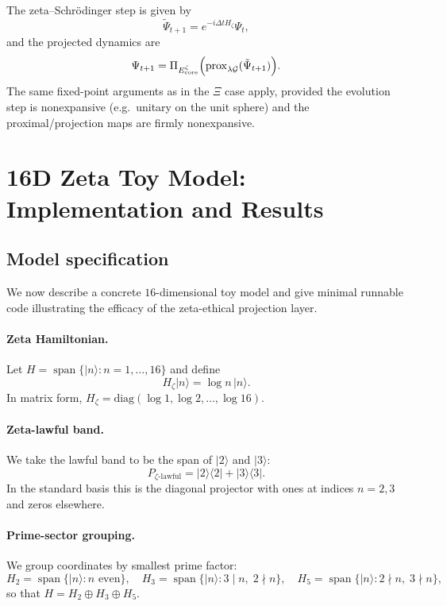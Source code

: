\documentclass[11pt]{article}
\begin{document}
The zeta--Schr\"odinger step is given by
\begin{equation}
  \tilde{\Psi}_{t+1} = e^{-i \Delta t H_\zeta}\Psi_t,
\end{equation}
and the projected dynamics are
\begin{equation}
  \Psi_{t+1} = \Pi_{E_{\mathrm{core}}^{\zeta}}
  \Bigl( \operatorname{prox}_{\lambda\mathcal{G}}(\tilde{\Psi}_{t+1}) \Bigr).
\end{equation}
The same fixed-point arguments as in the $\Xi$ case apply, provided the evolution step
is nonexpansive (e.g.\ unitary on the unit sphere) and the proximal/projection maps
are firmly nonexpansive.

\section{16D Zeta Toy Model: Implementation and Results}

\subsection{Model specification}

We now describe a concrete $16$-dimensional toy model and give minimal runnable code
illustrating the efficacy of the zeta-ethical projection layer.

\paragraph{Zeta Hamiltonian.}
Let $H = \operatorname{span}\{|n\rangle : n=1,\dots,16\}$ and define
\[
  H_\zeta |n\rangle = \log n\,|n\rangle.
\]
In matrix form, $H_\zeta = \mathrm{diag}(\log 1,\log 2,\dots,\log 16)$.

\paragraph{Zeta-lawful band.}
We take the lawful band to be the span of $|2\rangle$ and $|3\rangle$:
\[
  P_{\zeta\text{-lawful}} = |2\rangle\langle 2| + |3\rangle\langle 3|.
\]
In the standard basis this is the diagonal projector with ones at indices $n=2,3$ and zeros elsewhere.

\paragraph{Prime-sector grouping.}
We group coordinates by smallest prime factor:
\[
  H_2 = \operatorname{span}\{|n\rangle : n\text{ even}\},\quad
  H_3 = \operatorname{span}\{|n\rangle : 3\mid n,\;2\nmid n\},\quad
  H_5 = \operatorname{span}\{|n\rangle : 2\nmid n,\;3\nmid n\},
\]
so that $H = H_2\oplus H_3\oplus H_5$.
\end{document}
